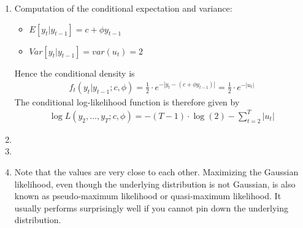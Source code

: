 \begin{enumerate}
\item Computation of the conditional expectation and variance:
	\begin{itemize}
	\item \(E[y_{t}|y_{t-1}] = c + \phi y_{t-1} \)
	\item \(Var[y_{t}|y_{t-1}] = var(u_t) = 2\) 
	\end{itemize}
Hence the conditional density is
\begin{align*}
f_t(y_{t}|y_{t-1}; c, \phi) = \frac{1}{2} \cdot e^{-|y_{t} -(c + \phi y_{t-1})|} = \frac{1}{2} \cdot e^{-|u_t|}
\end{align*}
The conditional log-likelihood function is therefore given by
\begin{align*}
\log L(y_{2}, \dots, y_{T};c, \phi) =-(T-1) \cdot \log(2) - \sum_{t=2}^{T} |u_{t}|
\end{align*}

\item 
\item 
      
\item Note that the values are very close to each other.
  Maximizing the Gaussian likelihood, even though the underlying distribution is not Gaussian,
  is also known as pseudo-maximum likelihood or quasi-maximum likelihood.
  It usually performs surprisingly well if you cannot pin down the underlying distribution.
\end{enumerate}